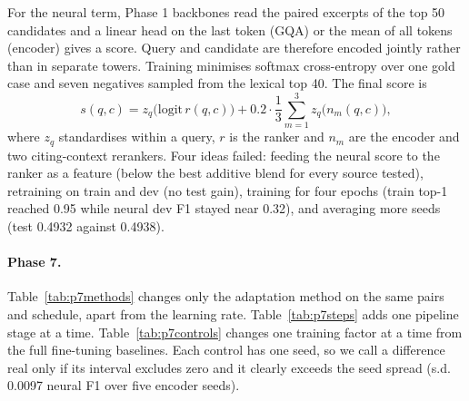 For the neural term, Phase 1 backbones read the paired excerpts of the top 50 candidates and a linear head on the last token (GQA) or the mean of all tokens (encoder) gives a score. Query and candidate are therefore encoded jointly rather than in separate towers. Training minimises softmax cross-entropy over one gold case and seven negatives sampled from the lexical top 40. The final score is
\begin{equation}
s(q,c) = z_q\big(\mathrm{logit}\,r(q,c)\big) + 0.2\cdot\frac{1}{3}\sum_{m=1}^{3} z_q\big(n_m(q,c)\big),
\end{equation}
where $z_q$ standardises within a query, $r$ is the ranker and $n_m$ are the encoder and two citing-context rerankers. Four ideas failed: feeding the neural score to the ranker as a feature (below the best additive blend for every source tested), retraining on train and dev (no test gain), training for four epochs (train top-1 reached 0.95 while neural dev F1 stayed near 0.32), and averaging more seeds (test 0.4932 against 0.4938).

\paragraph{Phase 7.} Table~\ref{tab:p7methods} changes only the adaptation method on the same pairs and schedule, apart from the learning rate. Table~\ref{tab:p7steps} adds one pipeline stage at a time. Table~\ref{tab:p7controls} changes one training factor at a time from the full fine-tuning baselines. Each control has one seed, so we call a difference real only if its interval excludes zero and it clearly exceeds the seed spread (s.d. 0.0097 neural F1 over five encoder seeds).

